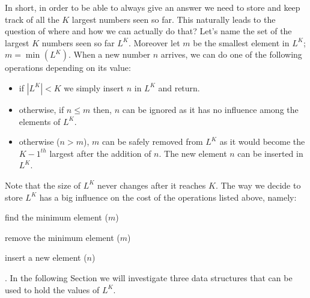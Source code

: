 In short, in order to be able to always give an answer we need to store and
keep track of all the $K$ largest numbers seen so far. This naturally leads to the question of where and how we can actually do that?
Let's name the set of the largest $K$ numbers seen so far $L^K$. Moreover let $m$ be the smallest
element in $L^K$; $m = \min_{} (L^K)$. When a new number $n$ arrives, we can do one of the following
operations depending on its value:
\begin{itemize}
	\item if $|L^K| < K$  we simply insert $n$ in $L^K$ and return.
	\item otherwise, if $n \leq m$ then, $n$ can be ignored as it has no influence among the
	elements of $L^K$.
	\item otherwise ($n > m$), $m$ can be safely removed from $L^K$ as it would become the
	$K-1^{th}$ largest after the addition of $n$. The new element $n$ can be inserted in $L^K$.
\end{itemize}
Note that the size of $L^K$ never changes after it reaches $K$. The way we decide to store $L^K$
has a big influence on the cost of the operations listed above, namely: 
\begin{enumerate*}
	\item find the minimum element ($m$)
	\item remove the minimum element ($m$)
	\item insert a new element ($n$) \end{enumerate*}. In the following Section we will investigate
three data structures that can be used to hold the values of $L^K$. 

